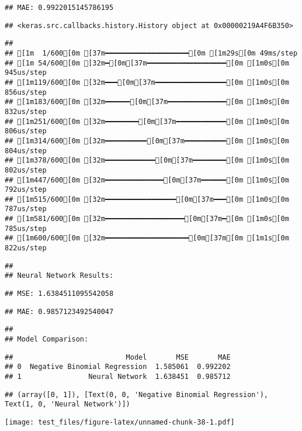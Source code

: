 \documentclass[
]{article}
\begin{document}
\begin{verbatim}
## MAE: 0.9922015145786195
\end{verbatim}

\begin{verbatim}
## <keras.src.callbacks.history.History object at 0x00000219A4F6B350>
\end{verbatim}

\begin{verbatim}
## 
## [1m  1/600[0m [37m━━━━━━━━━━━━━━━━━━━━[0m [1m29s[0m 49ms/step
## [1m 54/600[0m [32m━[0m[37m━━━━━━━━━━━━━━━━━━━[0m [1m0s[0m 945us/step
## [1m119/600[0m [32m━━━[0m[37m━━━━━━━━━━━━━━━━━[0m [1m0s[0m 856us/step
## [1m183/600[0m [32m━━━━━━[0m[37m━━━━━━━━━━━━━━[0m [1m0s[0m 832us/step
## [1m251/600[0m [32m━━━━━━━━[0m[37m━━━━━━━━━━━━[0m [1m0s[0m 806us/step
## [1m314/600[0m [32m━━━━━━━━━━[0m[37m━━━━━━━━━━[0m [1m0s[0m 804us/step
## [1m378/600[0m [32m━━━━━━━━━━━━[0m[37m━━━━━━━━[0m [1m0s[0m 802us/step
## [1m447/600[0m [32m━━━━━━━━━━━━━━[0m[37m━━━━━━[0m [1m0s[0m 792us/step
## [1m515/600[0m [32m━━━━━━━━━━━━━━━━━[0m[37m━━━[0m [1m0s[0m 787us/step
## [1m581/600[0m [32m━━━━━━━━━━━━━━━━━━━[0m[37m━[0m [1m0s[0m 785us/step
## [1m600/600[0m [32m━━━━━━━━━━━━━━━━━━━━[0m[37m[0m [1m1s[0m 822us/step
\end{verbatim}

\begin{verbatim}
## 
## Neural Network Results:
\end{verbatim}

\begin{verbatim}
## MSE: 1.6384511095542058
\end{verbatim}

\begin{verbatim}
## MAE: 0.9857123492540047
\end{verbatim}

\begin{verbatim}
## 
## Model Comparison:
\end{verbatim}

\begin{verbatim}
##                           Model       MSE       MAE
## 0  Negative Binomial Regression  1.585061  0.992202
## 1                Neural Network  1.638451  0.985712
\end{verbatim}

\begin{verbatim}
## (array([0, 1]), [Text(0, 0, 'Negative Binomial Regression'), Text(1, 0, 'Neural Network')])
\end{verbatim}

\texttt{[image: test\_files/figure-latex/unnamed-chunk-38-1.pdf]}
\end{document}
